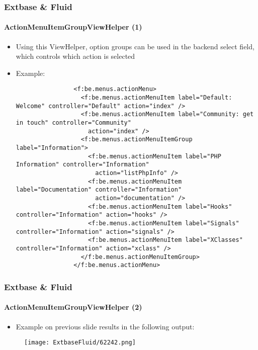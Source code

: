 \begin{frame}[fragile]
	\frametitle{Extbase \& Fluid}
	\framesubtitle{ActionMenuItemGroupViewHelper (1)}

	\lstset{basicstyle=\tiny\ttfamily}

	\begin{itemize}

		\item Using this ViewHelper, option groups can be used in the backend select field,
			which controls which action is selected

		\item Example:
			\begin{lstlisting}
				<f:be.menus.actionMenu>
				  <f:be.menus.actionMenuItem label="Default: Welcome" controller="Default" action="index" />
				  <f:be.menus.actionMenuItem label="Community: get in touch" controller="Community"
				    action="index" />
				  <f:be.menus.actionMenuItemGroup label="Information">
				    <f:be.menus.actionMenuItem label="PHP Information" controller="Information"
				      action="listPhpInfo" />
				    <f:be.menus.actionMenuItem label="Documentation" controller="Information"
				      action="documentation" />
				    <f:be.menus.actionMenuItem label="Hooks" controller="Information" action="hooks" />
				    <f:be.menus.actionMenuItem label="Signals" controller="Information" action="signals" />
				    <f:be.menus.actionMenuItem label="XClasses" controller="Information" action="xclass" />
				  </f:be.menus.actionMenuItemGroup>
				</f:be.menus.actionMenu>
			\end{lstlisting}

	\end{itemize}

\end{frame}


\begin{frame}[fragile]
	\frametitle{Extbase \& Fluid}
	\framesubtitle{ActionMenuItemGroupViewHelper (2)}

	\begin{itemize}
		\item Example on previous slide results in the following output:
	\end{itemize}

	\begin{figure}
		\texttt{[image: ExtbaseFluid/62242.png]}
	\end{figure}

\end{frame}

